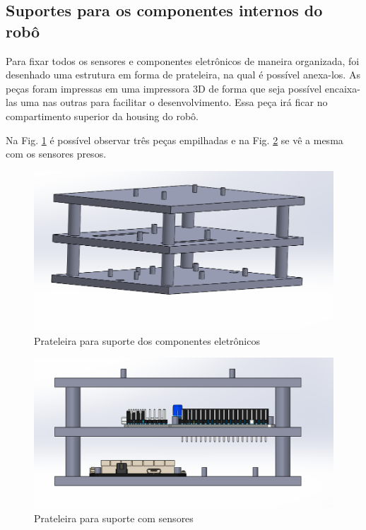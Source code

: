 \subsection{Suportes para os componentes internos do robô}

Para fixar todos os sensores e componentes eletrônicos de maneira organizada, foi desenhado uma estrutura em forma de prateleira, na qual é possível anexa-los. As peças foram impressas em uma impressora 3D de forma que seja possível encaixa-las uma nas outras para facilitar o desenvolvimento. Essa peça irá ficar no compartimento superior da housing do robô.

Na Fig. \ref{Prateleira} é possível observar três peças empilhadas e na Fig. \ref{Prateleiracsensor} se vê a mesma com os sensores presos.

    \begin{figure}[H]
	\centering
	\includegraphics[width=14cm]{Figures/prateleira.png}
	\caption{Prateleira para suporte dos componentes eletrônicos} \label{Prateleira}
	\end{figure}
	
	\begin{figure}[H]
	\centering
	\includegraphics[width=16cm]{Figures/prateleiracsensores.png}
	\caption{Prateleira para suporte com sensores} \label{Prateleiracsensor}
	\end{figure}

